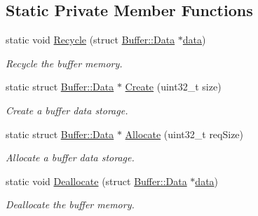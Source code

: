 \subsection*{Static Private Member Functions}
\begin{DoxyCompactItemize}
\item 
static void \hyperlink{classns3_1_1Buffer_aa14d4354b6de0c9d6044805f6503ecd2}{Recycle} (struct \hyperlink{structns3_1_1Buffer_1_1Data}{Buffer\+::\+Data} $\ast$\hyperlink{topology-example-sim_8cc_a26c65296e316af77b787dc77469bb2a4}{data})
\begin{DoxyCompactList}\small\item\em Recycle the buffer memory. \end{DoxyCompactList}\item 
static struct \hyperlink{structns3_1_1Buffer_1_1Data}{Buffer\+::\+Data} $\ast$ \hyperlink{classns3_1_1Buffer_a340c9888e35cf55d024808adfbd75913}{Create} (uint32\+\_\+t size)
\begin{DoxyCompactList}\small\item\em Create a buffer data storage. \end{DoxyCompactList}\item 
static struct \hyperlink{structns3_1_1Buffer_1_1Data}{Buffer\+::\+Data} $\ast$ \hyperlink{classns3_1_1Buffer_a7bbfa888d618a79ee413fe01a7b4ff68}{Allocate} (uint32\+\_\+t req\+Size)
\begin{DoxyCompactList}\small\item\em Allocate a buffer data storage. \end{DoxyCompactList}\item 
static void \hyperlink{classns3_1_1Buffer_a5cf2847bcc22da58cfa7e3a6b0279a01}{Deallocate} (struct \hyperlink{structns3_1_1Buffer_1_1Data}{Buffer\+::\+Data} $\ast$\hyperlink{topology-example-sim_8cc_a26c65296e316af77b787dc77469bb2a4}{data})
\begin{DoxyCompactList}\small\item\em Deallocate the buffer memory. \end{DoxyCompactList}\end{DoxyCompactItemize}
